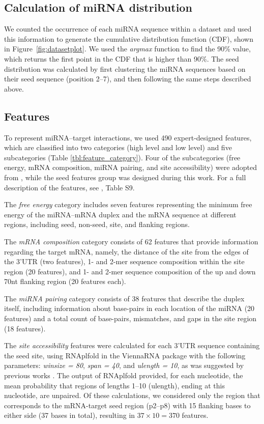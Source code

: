 \documentclass{bmcart}
\begin{document}
\subsection*{Calculation of miRNA distribution} \label{miRNAdistribution2}
We counted the occurrence of each miRNA sequence within a dataset and used this information to generate the cumulative distribution function (CDF), shown in Figure~\ref{fig:datasetplot}. We used the \textit{argmax} function to find the 90\% value, which returns the first point in the CDF that is higher than 90\%. 
The seed distribution was calculated by first clustering the miRNA sequences based on their seed sequence (position 2--7), and then following the same steps described above.


\subsection*{Features} \label{methods_features}
To represent miRNA--target interactions, we used 490 expert-designed features, which are classified into two categories (high level and low level) and five subcategories (Table \ref{tbl:feature_category}). Four of the subcategories (free energy, mRNA composition, miRNA pairing, and site accessibility) were adopted from \cite{wen2018deepmirtar}, while the seed features group was designed during this work. For a full description of the features, see ,  Table S9.



The \textit{free energy} category includes seven features representing the minimum free energy of the miRNA--mRNA duplex and the mRNA sequence at different regions, including seed, non-seed, site, and flanking regions. 

The \textit{mRNA composition} category consists of 62 features that provide information regarding the target mRNA, namely, the distance of the site from the edges of the 3'UTR (two features), 1- and 2-mer sequence composition within the site region (20 features), and 1- and 2-mer sequence composition of the up and down 70nt flanking region (20 features each). 

The \textit{miRNA pairing} category consists of 38 features that describe the duplex itself, including information about base-pairs in each location of the miRNA (20 features) and a total count of base-pairs, mismatches, and gaps in the site region (18 features).

The \textit{site accessibility} features were calculated for each 3'UTR sequence containing the seed site, using RNAplfold in the ViennaRNA package \cite{lorenz2011viennarna} with the following parameters:  \textit{winsize = 80}, \textit{span = 40}, and \textit{ulength = 10}, as was suggested by previous works \cite{menor2014mirmark, wen2018deepmirtar}. The output of RNAplfold provided, for each nucleotide, the mean probability that regions of lengths 1--10 (ulength), ending at this nucleotide, are unpaired. Of these calculations, we considered only the region that corresponds to the mRNA-target seed region (p2–p8) with 15 flanking bases to either side (37 bases in total), resulting in $37 \times 10 = 370$ features.
\end{document}
